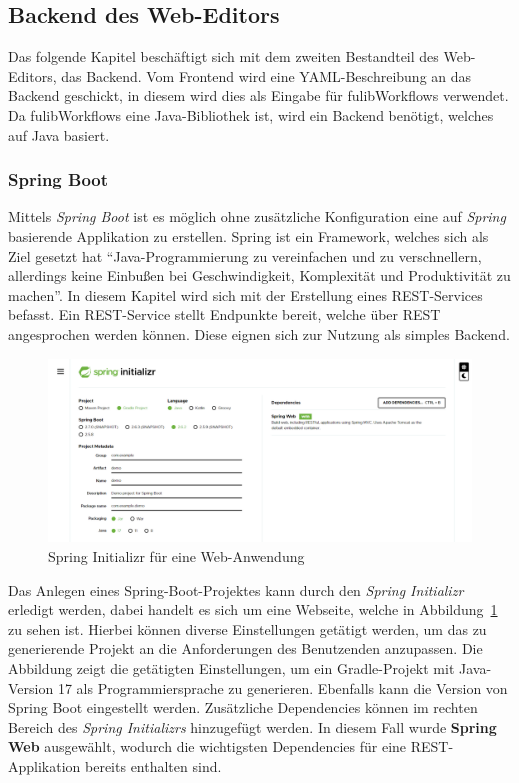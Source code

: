 \subsection{Backend des Web-Editors}\label{subsec:backend}
Das folgende Kapitel beschäftigt sich mit dem zweiten Bestandteil des Web-Editors, das Backend.
Vom Frontend wird eine YAML-Beschreibung an das Backend geschickt, in diesem wird dies als Eingabe für fulibWorkflows verwendet.
Da fulibWorkflows eine Java-Bibliothek ist, wird ein Backend benötigt, welches auf Java basiert.

\subsubsection{Spring Boot}
Mittels \textit{Spring Boot} ist es möglich ohne zusätzliche Konfiguration eine auf \textit{Spring} basierende Applikation zu erstellen\cite*{springBoot}.
Spring ist ein Framework, welches sich als Ziel gesetzt hat ``Java-Programmierung zu vereinfachen und zu verschnellern, allerdings keine Einbußen
bei Geschwindigkeit, Komplexität und Produktivität zu machen''\cite*{spring}.
In diesem Kapitel wird sich mit der Erstellung eines \ac{REST}-Services befasst.
Ein \ac{REST}-Service stellt Endpunkte bereit, welche über \ac{REST} angesprochen werden können.
Diese eignen sich zur Nutzung als simples Backend.

\begin{figure}[h]
    \centering
    \includegraphics[width=1.0\textwidth]{images/2.2/spring-init}
    \caption{Spring Initializr für eine Web-Anwendung}
    \label{fig:spring-init}
\end{figure}


Das Anlegen eines Spring-Boot-Projektes kann durch den \textit{Spring Initializr} erledigt werden, dabei handelt es sich um eine Webseite, welche in
Abbildung~\ref{fig:spring-init} zu sehen ist\cite*{sbinit}.
Hierbei können diverse Einstellungen getätigt werden, um das zu generierende Projekt an die Anforderungen des Benutzenden anzupassen.
Die Abbildung zeigt die getätigten Einstellungen, um ein Gradle-Projekt mit Java-Version 17 als Programmiersprache zu generieren.
Ebenfalls kann die Version von Spring Boot eingestellt werden.
Zusätzliche Dependencies können im rechten Bereich des \textit{Spring Initializrs} hinzugefügt werden.
In diesem Fall wurde \textbf{Spring Web} ausgewählt, wodurch die wichtigsten Dependencies für eine \ac{REST}-Applikation bereits enthalten sind.


